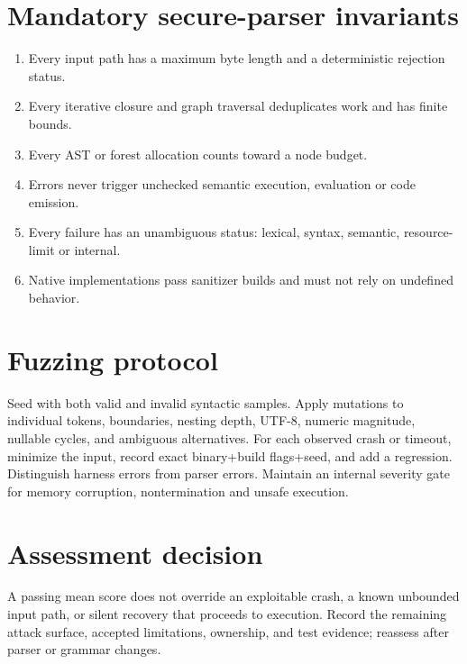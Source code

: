 \documentclass[11pt,letterpaper]{article}
\begin{document}
\section{Mandatory secure-parser invariants}
\begin{enumerate}\item Every input path has a maximum byte length and a deterministic rejection status.\item Every iterative closure and graph traversal deduplicates work and has finite bounds.\item Every AST or forest allocation counts toward a node budget.\item Errors never trigger unchecked semantic execution, evaluation or code emission.\item Every failure has an unambiguous status: lexical, syntax, semantic, resource-limit or internal.\item Native implementations pass sanitizer builds and must not rely on undefined behavior.\end{enumerate}
\section{Fuzzing protocol}
Seed with both valid and invalid syntactic samples. Apply mutations to individual tokens, boundaries, nesting depth, UTF-8, numeric magnitude, nullable cycles, and ambiguous alternatives. For each observed crash or timeout, minimize the input, record exact binary+build flags+seed, and add a regression. Distinguish harness errors from parser errors. Maintain an internal severity gate for memory corruption, nontermination and unsafe execution.
\section{Assessment decision}
A passing mean score does not override an exploitable crash, a known unbounded input path, or silent recovery that proceeds to execution. Record the remaining attack surface, accepted limitations, ownership, and test evidence; reassess after parser or grammar changes.
\end{document}

